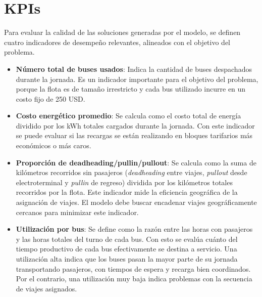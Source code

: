\section{KPIs \label{sec:kpis}}

Para evaluar la calidad de las soluciones generadas por el modelo, se definen cuatro indicadores de desempe\~no relevantes, alineados con el objetivo del problema.

\begin{itemize}
\item \textbf{N\'umero total de buses usados}: Indica la cantidad de buses despachados durante la jornada. Es un indicador importante para el objetivo del problema, porque la flota es de tama\~no irrestricto y cada bus utilizado incurre en un costo fijo de 250 USD.
\item \textbf{Costo energ\'etico promedio}: Se calcula como el costo total de energ\'ia dividido por los kWh totales cargados durante la jornada. Con este indicador se puede evaluar si las recargas se est\'an realizando en bloques tarifarios m\'as econ\'omicos o m\'as caros.
\item \textbf{Proporci\'on de deadheading/pullin/pullout}: Se calcula como la suma de kil\'ometros recorridos sin pasajeros (\emph{deadheading} entre viajes, \emph{pullout} desde electroterminal y \emph{pullin} de regreso) dividida por los kil\'ometros totales recorridos por la flota. Este indicador mide la eficiencia geogr\'afica de la asignaci\'on de viajes. El modelo debe buscar encadenar viajes geogr\'aficamente cercanos para minimizar este indicador.
\item \textbf{Utilizaci\'on por bus}: Se define como la raz\'on entre las horas con pasajeros y las horas totales del turno de cada bus. Con esto se eval\'ua cu\'anto del tiempo productivo de cada bus efectivamente se destina a servicio. Una utilizaci\'on alta indica que los buses pasan la mayor parte de su jornada transportando pasajeros, con tiempos de espera y recarga bien coordinados. Por el contrario, una utilizaci\'on muy baja indica problemas con la secuencia de viajes asignados.
\end{itemize}
